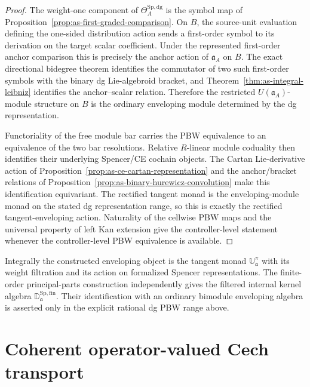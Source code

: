 \begin{proof}
The weight-one component of $\Theta_A^{\mathrm{Sp,dg}}$ is the symbol map of
Proposition~\ref{prop:as-first-graded-comparison}.  On $B$, the source-unit
evaluation defining the one-sided distribution action sends a first-order
symbol to its derivation on the target scalar coefficient.  Under the
represented first-order anchor comparison this is precisely the anchor action
of $\mathfrak a_A$ on $B$.  The exact directional bidegree theorem identifies
the commutator of two such first-order symbols with the binary dg
Lie-algebroid bracket, and
Theorem~\ref{thm:as-integral-leibniz} identifies the anchor--scalar relation.
Therefore the restricted $U(\mathfrak a_A)$-module structure on $B$ is the
ordinary enveloping module determined by the dg representation.

Functoriality of the free module bar carries the PBW equivalence to an
equivalence of the two bar resolutions.  Relative $R$-linear module coduality
then identifies their underlying Spencer/CE cochain objects.  The Cartan
Lie-derivative action of Proposition~\ref{prop:as-ce-cartan-representation}
and the anchor/bracket relations of
Proposition~\ref{prop:as-binary-hurewicz-convolution} make this identification
equivariant.  The rectified tangent monad is
the enveloping-module monad on the stated dg representation range, so this is
exactly the rectified tangent-enveloping action.  Naturality of the cellwise
PBW maps and the universal property of left Kan extension give the
controller-level statement whenever the controller-level PBW equivalence is
available.
\end{proof}

\begin{remark}
Integrally the constructed enveloping object is the tangent monad
$\mathbb U_{\mathfrak a}^{\pi}$ with its weight filtration and its action on
formalized Spencer representations.  The finite-order principal-parts
construction independently gives the filtered internal kernel algebra
$\mathbb D_{\mathfrak a}^{\mathrm{Sp,fin}}$.  Their identification with an
ordinary bimodule enveloping algebra is asserted only in the explicit
rational dg PBW range above.
\end{remark}

\section{Coherent operator-valued Cech transport}
\label{sec:as-operator-mc}

